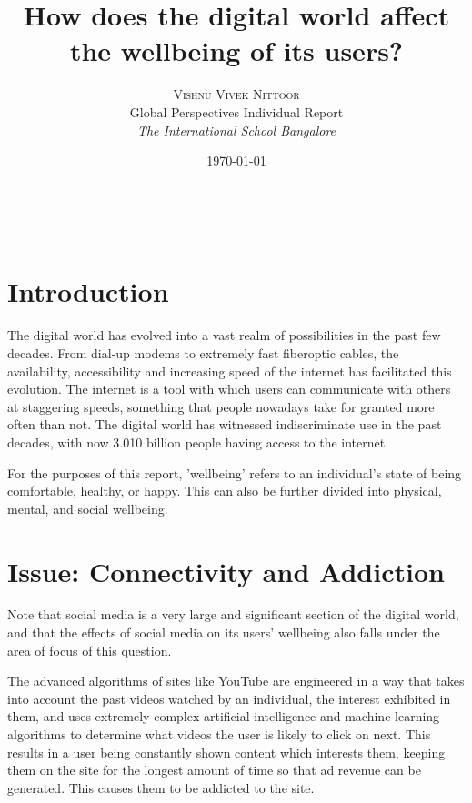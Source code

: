 \documentclass[a4paper, 11pt]{article}
\title{\textbf{How does the digital world affect the wellbeing of its users?}}
\author{\textsc{Vishnu Vivek Nittoor} \\
      Global Perspectives Individual Report\\
      {\textit{The International School Bangalore}}
      }
\date{\today}
\makeatletter
\renewcommand{\maketitle}{
\begin{flushright}
{\LARGE\@title}

\vspace{20pt}

{\large\@author}
\\\@date %

\vspace{40pt} %
\end{flushright}
}
\makeatother
\begin{document}
\maketitle

\vspace{30pt}

\section*{Introduction}

The digital world has evolved into a vast realm of possibilities in the past few decades. From dial-up modems to extremely fast fiberoptic cables, the availability, accessibility and increasing speed of the internet has facilitated this evolution. The internet is a tool with which users can communicate with others at staggering speeds, something that people nowadays take for granted more often than not.\cite{speedoflight-communication} The digital world has witnessed indiscriminate use in the past decades, with now 3.010 billion people having access to the internet.\cite{world-population-online}

For the purposes of this report, 'wellbeing' refers to an individual's state of being comfortable, healthy, or happy. This can also be further divided into physical, mental, and social wellbeing.\cite{physical-wellbeing-definition, who-mental-wellbeing, social-wellbeing-definition}

\section{Issue: Connectivity and Addiction}

    Note that social media is a very large and significant section of the digital world, and that the effects of social media on its users' wellbeing also falls under the area of focus of this question.

    The advanced algorithms of sites like YouTube are engineered in a way that takes into account the past videos watched by an individual, the interest exhibited in them, and uses extremely complex artificial intelligence and machine learning algorithms to determine what videos the user is likely to click on next.\cite{youtube-algorithm} This results in a user being constantly shown content which interests them, keeping them on the site for the longest amount of time so that ad revenue can be generated. This causes them to be addicted to the site.
\end{document}
